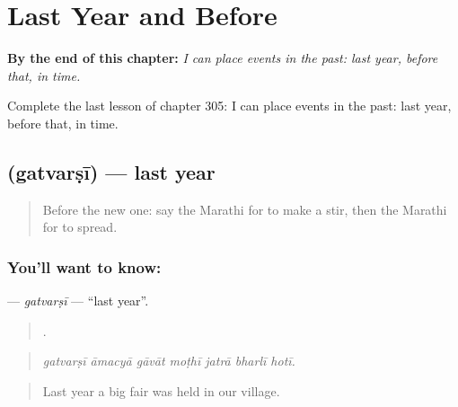 
\chapter{Last Year and Before}
\label{ch:mr-last-year-and-before}

\begin{chapteropening}
\textbf{By the end of this chapter:} \emph{I can place events in the past: last year, before that, in time.}

Complete the last lesson of chapter 305: I can place events in the past: last year, before that, in time.
\end{chapteropening}

\section[\texorpdfstring{\mr{गतवर्षी} (gatvarṣī)}{गतवर्षी (gatvarṣī)}]{ (gatvarṣī) — last year}

\label{lesson:MR-C305-gatvarsi}



\begin{quote}
Before the new one: say the Marathi for to make a stir, then the Marathi for to spread.
\end{quote}

\subsection*{You'll want to know: }
\textbf{} — \emph{gatvarṣī} — \textquotedblleft{}last year\textquotedblright{}.

\begin{quote}
      .
\end{quote}

\begin{quote}
\emph{gatvarṣī āmacyā gāvāt moṭhī jatrā bharlī hotī.}
\end{quote}

\begin{quote}
Last year a big fair was held in our village.
\end{quote}

